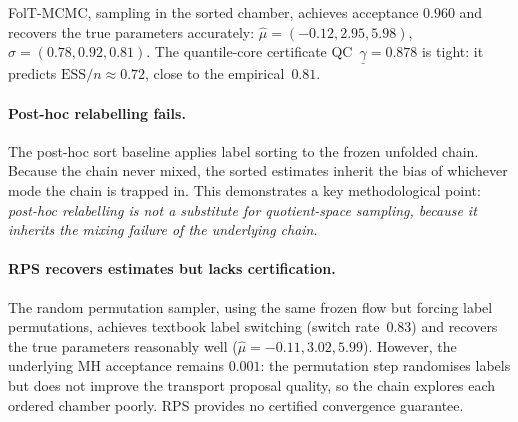 FolT-MCMC, sampling in the sorted chamber, achieves acceptance
$0.960$ and recovers the true parameters
accurately: $\hat\mu = (-0.12, 2.95, 5.98)$,
$\hat\sigma = (0.78, 0.92, 0.81)$.  The quantile-core certificate
QC~$\underline{\gamma} = 0.878$ is tight: it predicts
$\mathrm{ESS}/n \approx 0.72$, close to the empirical~$0.81$.

\paragraph{Post-hoc relabelling fails.}
The post-hoc sort baseline applies label sorting to the frozen
unfolded chain.  Because the chain never mixed, the sorted
estimates inherit the bias of whichever mode the chain is trapped
in.  This demonstrates a key methodological point:
\emph{post-hoc relabelling is not a substitute for quotient-space
sampling, because it inherits the mixing failure of the underlying
chain}.

\paragraph{RPS recovers estimates but lacks certification.}
The random permutation sampler, using the same frozen flow but
forcing label permutations, achieves textbook label switching
(switch rate~$0.83$) and recovers the true parameters reasonably
well ($\hat\mu = -0.11, 3.02, 5.99$).  However, the underlying
MH acceptance remains $0.001$: the permutation step randomises
labels but does not improve the transport proposal quality, so
the chain explores each ordered chamber poorly.
RPS provides no certified convergence guarantee.
